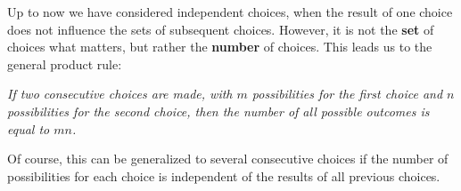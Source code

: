 

\setcounter{section}{1}
\setcounter{subsection}{2}
\setcounter{dfn}{1}


Up to now we have considered independent choices,
when the result of one choice does not influence the sets of subsequent choices.
However, it is not the \textbf{set} of choices what matters, but rather the \textbf{number} of choices.
This leads us to the general product rule:
\begin{center}
\parbox{.9\textwidth}{\emph{If two consecutive choices are made, with $m$ possibilities for the first choice and $n$ possibilities for the second choice,
then the number of all possible outcomes is equal to $mn$.}}
\end{center}
Of course, this can be generalized to several consecutive choices
if the number of possibilities for each choice is independent of the results of all previous choices.


